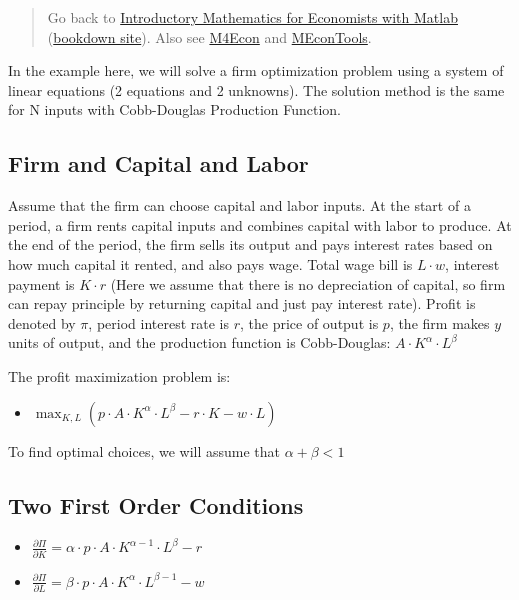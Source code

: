 \documentclass[
]{book}
\providecommand{\tightlist}{%
  \setlength{\itemsep}{0pt}\setlength{\parskip}{0pt}}
\begin{document}
\begin{quote}
Go back to \href{https://math4econ.github.io/}{Introductory Mathematics for Economists with Matlab} (\href{https://math4econ.github.io/bookdown}{bookdown site}). Also see \href{http://fanwangecon.github.io/M4Econ}{M4Econ} and \href{https://fanwangecon.github.io/MEconTools/}{MEconTools}.
\end{quote}

In the example here, we will solve a firm optimization problem using a
system of linear equations (2 equations and 2 unknowns). The solution
method is the same for N inputs with Cobb-Douglas Production Function.

\hypertarget{firm-and-capital-and-labor}{%
\subsection{Firm and Capital and Labor}\label{firm-and-capital-and-labor}}

Assume that the firm can choose capital and labor inputs. At the start
of a period, a firm rents capital inputs and combines capital with labor
to produce. At the end of the period, the firm sells its output and pays
interest rates based on how much capital it rented, and also pays wage.
Total wage bill is \(L\cdot w\), interest payment is \(K\cdot r\) (Here we
assume that there is no depreciation of capital, so firm can repay
principle by returning capital and just pay interest rate). Profit is
denoted by \(\pi\), period interest rate is \(r\), the price of output is
\(p\), the firm makes \(y\) units of output, and the production function is
Cobb-Douglas: \(A\cdot K^{\alpha } \cdot L^{\beta }\)

The profit maximization problem is:

\begin{itemize}
\tightlist
\item
  \(\displaystyle \max_{K,L} \left(p\cdot A\cdot K^{\alpha } \cdot L^{\beta } -r\cdot K-w\cdot L\right)\)
\end{itemize}

To find optimal choices, we will assume that \(\alpha +\beta <1\)

\hypertarget{two-first-order-conditions}{%
\subsection{Two First Order Conditions}\label{two-first-order-conditions}}

\begin{itemize}
\item
  \(\displaystyle \frac{\partial \Pi }{\partial K}=\alpha \cdot p\cdot A\cdot K^{\alpha -1} \cdot L^{\beta } -r\)
\item
  \(\displaystyle \frac{\partial \Pi }{\partial L}=\beta \cdot p\cdot A\cdot K^{\alpha } \cdot L^{\beta -1} -w\)
\end{itemize}
\end{document}
